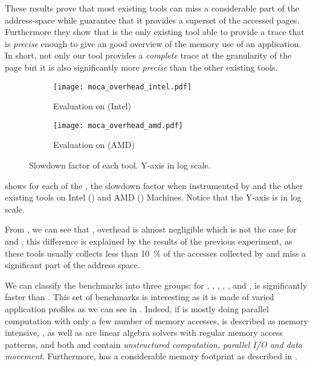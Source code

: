 These results prove that most existing tools can miss a considerable part of
the address-space while \Moca guarantee that it provides a superset of the accessed
pages. Furthermore they show that \Moca is the only existing tool able to provide a
trace that is \emph{precise} enough to give an good overview of the memory use of an application. In
short, not only our tool provides a \emph{complete} trace at the granularity of the
page but it is also significantly more \emph{precise} than the other existing tools.

\begin{figure}[htb]
    \centering
    \begin{subfigure}{\linewidth}
        \texttt{[image: moca\_overhead\_intel.pdf]}
        \caption{Evaluation on \Edel (Intel)}
        \label{fig:ovh-Intel}
    \end{subfigure}
    \begin{subfigure}{\linewidth}
        \texttt{[image: moca\_overhead\_amd.pdf]}
        \caption{Evaluation on \Stremi (AMD)}
        \label{fig:ovh-AMD}
    \end{subfigure}
    \caption{Slowdown factor of each tool.
    Y-axis in log scale.}
    \label{fig:ovh}
\end{figure}

 shows for each of the \NPB, the slowdown factor when
instrumented by \Moca and the other existing tools on Intel
() and AMD () Machines. Notice that the Y-axis is in
log scale.

From , we can see that \Mitos, \MitosTun overhead is
almost negligible which is not the case for \Moca and \TABARNAC, this
difference is explained by the results of the previous experiment, as these
tools usually collects less than \SI{10}{\%} of the accesses collected by \Moca and
miss a significant part of the address space.

We can classify the benchmarks into three groups:
for \BT, \CG, \DC,  \EP, \LU, \SP and \UA, \Moca is
significantly faster than \TABARNAC. This set of benchmarks is interesting as
it is made of varied application profiles as we can see in .
Indeed, if \EP is mostly doing parallel computation with only a few number of
memory accesses, \CG is described as memory intensive,
\BT, \LU as well as \SP are linear algebra solvers with regular memory access patterns,
and both \UA and \DC contain \emph{unstructured computation,
parallel I/O and data movement}. Furthermore, \DC has a considerable memory footprint as
described in .

